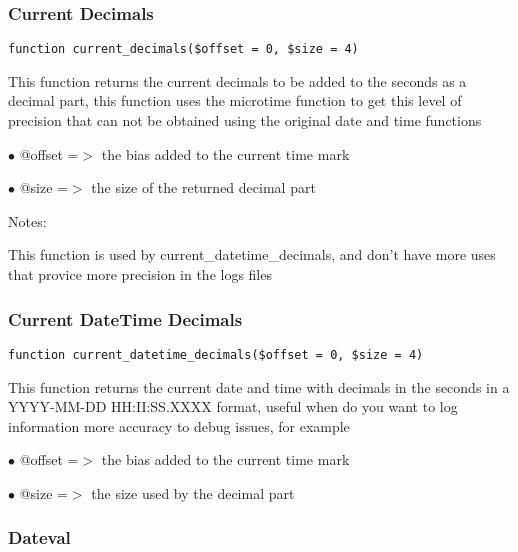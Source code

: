 \documentclass[a4paper]{article}
\begin{document}
\hypertarget{toc100}{}
\subsubsection{Current Decimals}

\begin{lstlisting}
function current_decimals($offset = 0, $size = 4)
\end{lstlisting}

This function returns the current decimals to be added to the seconds as a
decimal part, this function uses the microtime function to get this level of
precision that can not be obtained using the original date and time functions

\begin{compactitem}
\item[\color{myblue}$\bullet$] @offset =$>$ the bias added to the current time mark
\item[\color{myblue}$\bullet$] @size   =$>$ the size of the returned decimal part
\end{compactitem}

Notes:

This function is used by current\_datetime\_decimals, and don't have more uses
that provice more precision in the logs files

\hypertarget{toc101}{}
\subsubsection{Current DateTime Decimals}

\begin{lstlisting}
function current_datetime_decimals($offset = 0, $size = 4)
\end{lstlisting}

This function returns the current date and time with decimals in the seconds
in a YYYY-MM-DD HH:II:SS.XXXX format, useful when do you want to log information
more accuracy to debug issues, for example

\begin{compactitem}
\item[\color{myblue}$\bullet$] @offset =$>$ the bias added to the current time mark
\item[\color{myblue}$\bullet$] @size   =$>$ the size used by the decimal part
\end{compactitem}

\hypertarget{toc102}{}
\subsubsection{Dateval}
\end{document}
